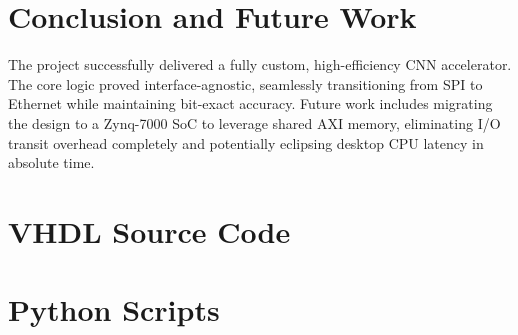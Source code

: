 \documentclass[12pt,a4paper]{article}
\begin{document}
\section{Conclusion and Future Work}
The project successfully delivered a fully custom, high-efficiency CNN accelerator. The core logic proved interface-agnostic, seamlessly transitioning from SPI to Ethernet while maintaining bit-exact accuracy. 
Future work includes migrating the design to a Zynq-7000 SoC to leverage shared AXI memory, eliminating I/O transit overhead completely and potentially eclipsing desktop CPU latency in absolute time.

\newpage
\appendix
\section{VHDL Source Code}


\section{Python Scripts}

\end{document}
